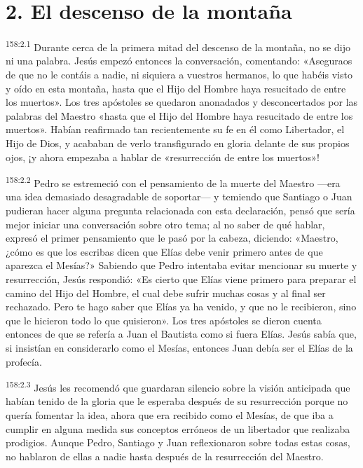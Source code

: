 \section*{2. El descenso de la montaña}
\par 
\textsuperscript{158:2.1} Durante cerca de la primera mitad del descenso de la montaña, no se dijo ni una palabra. Jesús empezó entonces la conversación, comentando: «Aseguraos de que no le contáis a nadie, ni siquiera a vuestros hermanos, lo que habéis visto y oído en esta montaña, hasta que el Hijo del Hombre haya resucitado de entre los muertos». Los tres apóstoles se quedaron anonadados y desconcertados por las palabras del Maestro «hasta que el Hijo del Hombre haya resucitado de entre los muertos». Habían reafirmado tan recientemente su fe en él como Libertador, el Hijo de Dios, y acababan de verlo transfigurado en gloria delante de sus propios ojos, ¡y ahora empezaba a hablar de «resurrección de entre los muertos»!

\par 
\textsuperscript{158:2.2} Pedro se estremeció con el pensamiento de la muerte del Maestro ---era una idea demasiado desagradable de soportar--- y temiendo que Santiago o Juan pudieran hacer alguna pregunta relacionada con esta declaración, pensó que sería mejor iniciar una conversación sobre otro tema; al no saber de qué hablar, expresó el primer pensamiento que le pasó por la cabeza, diciendo: «Maestro, ¿cómo es que los escribas dicen que Elías debe venir primero antes de que aparezca el Mesías?» Sabiendo que Pedro intentaba evitar mencionar su muerte y resurrección, Jesús respondió: «Es cierto que Elías viene primero para preparar el camino del Hijo del Hombre, el cual debe sufrir muchas cosas y al final ser rechazado. Pero te hago saber que Elías ya ha venido, y que no le recibieron, sino que le hicieron todo lo que quisieron». Los tres apóstoles se dieron cuenta entonces de que se refería a Juan el Bautista como si fuera Elías. Jesús sabía que, si insistían en considerarlo como el Mesías, entonces Juan debía ser el Elías de la profecía.

\par 
\textsuperscript{158:2.3} Jesús les recomendó que guardaran silencio sobre la visión anticipada que habían tenido de la gloria que le esperaba después de su resurrección porque no quería fomentar la idea, ahora que era recibido como el Mesías, de que iba a cumplir en alguna medida sus conceptos erróneos de un libertador que realizaba prodigios. Aunque Pedro, Santiago y Juan reflexionaron sobre todas estas cosas, no hablaron de ellas a nadie hasta después de la resurrección del Maestro.

